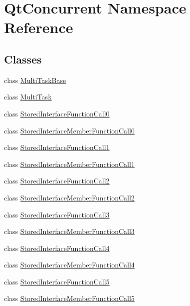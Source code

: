 \hypertarget{namespace_qt_concurrent}{\section{\-Qt\-Concurrent \-Namespace \-Reference}
\label{namespace_qt_concurrent}
}
\subsection*{\-Classes}
\begin{DoxyCompactItemize}
\item 
class \hyperlink{class_qt_concurrent_1_1_multi_task_base}{\-Multi\-Task\-Base}
\item 
class \hyperlink{class_qt_concurrent_1_1_multi_task}{\-Multi\-Task}
\item 
class \hyperlink{class_qt_concurrent_1_1_stored_interface_function_call0}{\-Stored\-Interface\-Function\-Call0}
\item 
class \hyperlink{class_qt_concurrent_1_1_stored_interface_member_function_call0}{\-Stored\-Interface\-Member\-Function\-Call0}
\item 
class \hyperlink{class_qt_concurrent_1_1_stored_interface_function_call1}{\-Stored\-Interface\-Function\-Call1}
\item 
class \hyperlink{class_qt_concurrent_1_1_stored_interface_member_function_call1}{\-Stored\-Interface\-Member\-Function\-Call1}
\item 
class \hyperlink{class_qt_concurrent_1_1_stored_interface_function_call2}{\-Stored\-Interface\-Function\-Call2}
\item 
class \hyperlink{class_qt_concurrent_1_1_stored_interface_member_function_call2}{\-Stored\-Interface\-Member\-Function\-Call2}
\item 
class \hyperlink{class_qt_concurrent_1_1_stored_interface_function_call3}{\-Stored\-Interface\-Function\-Call3}
\item 
class \hyperlink{class_qt_concurrent_1_1_stored_interface_member_function_call3}{\-Stored\-Interface\-Member\-Function\-Call3}
\item 
class \hyperlink{class_qt_concurrent_1_1_stored_interface_function_call4}{\-Stored\-Interface\-Function\-Call4}
\item 
class \hyperlink{class_qt_concurrent_1_1_stored_interface_member_function_call4}{\-Stored\-Interface\-Member\-Function\-Call4}
\item 
class \hyperlink{class_qt_concurrent_1_1_stored_interface_function_call5}{\-Stored\-Interface\-Function\-Call5}
\item 
class \hyperlink{class_qt_concurrent_1_1_stored_interface_member_function_call5}{\-Stored\-Interface\-Member\-Function\-Call5}
\end{DoxyCompactItemize}

